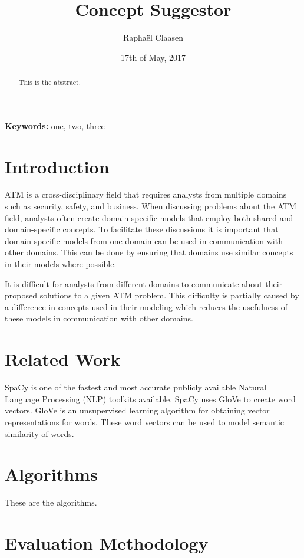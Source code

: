\documentclass{article}
\title{Concept Suggestor}
\date{17th of May, 2017}
\author{Rapha\"el Claasen}
\begin{document}
\maketitle

\begin{abstract}
This is the abstract.
\end{abstract}

{\bf Keywords:} one, two, three

\section{Introduction}

ATM is a cross-disciplinary field that requires analysts from multiple domains such as security, safety, and business. When discussing problems about the ATM field, analysts often create domain-specific models that employ both shared and domain-specific concepts. To facilitate these discussions it is important that domain-specific models from one domain can be used in communication with other domains. This can be done by ensuring that domains use similar concepts in their models where possible.

It is difficult for analysts from different domains to communicate about their proposed solutions to a given ATM problem. This difficulty is partially caused by a difference in concepts used in their modeling which reduces the usefulness of these models in communication with other domains.

\section{Related Work}

SpaCy is one of the fastest and most accurate publicly available Natural Language Processing (NLP) toolkits available.\cite{choi2015depends}
SpaCy uses GloVe to create word vectors. GloVe is an unsupervised learning algorithm for obtaining vector representations for words.\cite{pennington2014glove} These word vectors can be used to model semantic similarity of words.

\section{Algorithms}

These are the algorithms.

\section{Evaluation Methodology}
\end{document}
